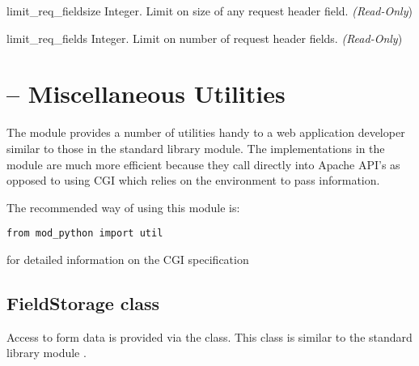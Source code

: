\begin{memberdesc}[server]{limit_req_fieldsize}
Integer. Limit on size of any request header field.
\emph{(Read-Only})
\end{memberdesc}

\begin{memberdesc}[server]{limit_req_fields}
Integer. Limit on number of request header fields.
\emph{(Read-Only})
\end{memberdesc}

\section{ -- Miscellaneous Utilities\label{pyapi-util}}

The  module provides a number of utilities handy to a web
application developer similar to those in the standard library
 module. The implementations in the  module
are much more efficient because they call directly into Apache API's
as opposed to using CGI which relies on the environment to pass
information.

The recommended way of using this module is:
\begin{verbatim}
from mod_python import util
\end{verbatim}

\begin{seealso}
	{for detailed information on the CGI specification}
\end{seealso}

\subsection{FieldStorage class\label{pyapi-util-fstor}}

Access to form data is provided via the 
class. This class is similar to the standard library module
 .

